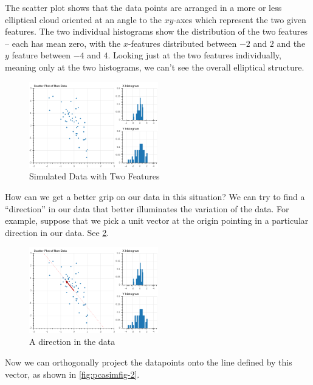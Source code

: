 \documentclass[]{article}
\begin{document}
The scatter plot shows that the data points are arranged in a more or
less elliptical cloud oriented at an angle to the \(xy\)-axes which
represent the two given features. The two individual histograms show the
distribution of the two features -- each has mean zero, with the
\(x\)-features distributed between \(-2\) and \(2\) and the \(y\)
feature between \(-4\) and \(4\). Looking just at the two features
individually, meaning only at the two histograms, we can't see the
overall elliptical structure.

\begin{figure}
\hypertarget{fig:pcasimfig}{%
\centering
\includegraphics[width=0.5\textwidth,height=\textheight]{../img/PCAsimulated-1.png}
\caption{Simulated Data with Two Features}\label{fig:pcasimfig}
}
\end{figure}

How can we get a better grip on our data in this situation? We can try
to find a ``direction'' in our data that better illuminates the
variation of the data. For example, suppose that we pick a unit vector
at the origin pointing in a particular direction in our data. See
\cref{fig:pcasimfig-1}.

\begin{figure}
\hypertarget{fig:pcasimfig-1}{%
\centering
\includegraphics[width=0.5\textwidth,height=\textheight]{../img/PCAsimulated-2.png}
\caption{A direction in the data}\label{fig:pcasimfig-1}
}
\end{figure}

Now we can orthogonally project the datapoints onto the line defined by
this vector, as shown in \cref{fig:pcasimfig-2}.
\end{document}

